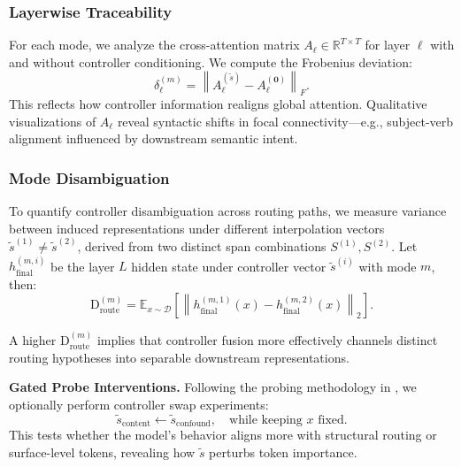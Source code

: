\subsubsection*{Layerwise Traceability}

For each mode, we analyze the cross-attention matrix \(A_\ell \in \mathbb{R}^{T \times T}\) for layer \(\ell\) with and without controller conditioning. We compute the Frobenius deviation:
\[
\delta_\ell^{(m)} = \left\| A_\ell^{(\tilde{s})} - A_\ell^{(\mathbf{0})} \right\|_F.
\]
This reflects how controller information realigns global attention. Qualitative visualizations of \(A_\ell\) reveal syntactic shifts in focal connectivity—e.g., subject-verb alignment influenced by downstream semantic intent.

\subsubsection*{Mode Disambiguation}

To quantify controller disambiguation across routing paths, we measure variance between induced representations under different interpolation vectors \(\tilde{s}^{(1)} \ne \tilde{s}^{(2)}\), derived from two distinct span combinations \(S^{(1)}, S^{(2)}\). Let \(h_{\text{final}}^{(m, i)}\) be the layer \(L\) hidden state under controller vector \(\tilde{s}^{(i)}\) with mode \(m\), then:
\[
\mathrm{D}_{\text{route}}^{(m)} = \mathbb{E}_{x \sim \mathcal{D}} \left[ \left\| h_{\text{final}}^{(m, 1)}(x) - h_{\text{final}}^{(m, 2)}(x) \right\|_2 \right].
\]

A higher \(\mathrm{D}_{\text{route}}^{(m)}\) implies that controller fusion more effectively channels distinct routing hypotheses into separable downstream representations.

\vspace{0.75em}
\noindent\textbf{Gated Probe Interventions.} Following the probing methodology in \cite{vig2020investigating}, we optionally perform controller swap experiments:
\[
\tilde{s}_{\text{content}} \leftarrow \tilde{s}_{\text{confound}}, \quad \text{while keeping } x \text{ fixed}.
\]
This tests whether the model's behavior aligns more with structural routing or surface-level tokens, revealing how \(\tilde{s}\) perturbs token importance.


